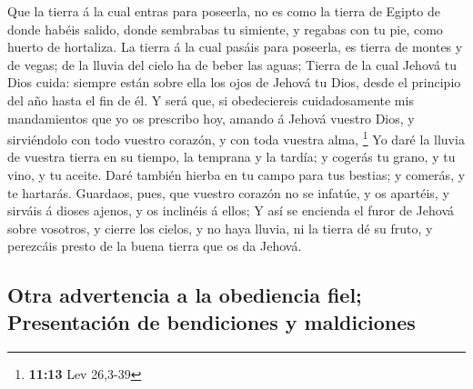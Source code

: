  Que la tierra á la cual entras para poseerla, no es como
la tierra de Egipto de donde habéis salido, donde sembrabas tu simiente,
y regabas con tu pie, como huerto de hortaliza.  La tierra
á la cual pasáis para poseerla, es tierra de montes y de vegas; de la
lluvia del cielo ha de beber las aguas;  Tierra de la cual
Jehová tu Dios cuida: siempre están sobre ella los ojos de Jehová tu
Dios, desde el principio del año hasta el fin de él.  Y
será que, si obedeciereis cuidadosamente mis mandamientos que yo os
prescribo hoy, amando á Jehová vuestro Dios, y sirviéndolo con todo
vuestro corazón, y con toda vuestra alma, \footnote{\textbf{11:13} Lev
  26,3-39}  Yo daré la lluvia de vuestra tierra en su
tiempo, la temprana y la tardía; y cogerás tu grano, y tu vino, y tu
aceite.  Daré también hierba en tu campo para tus bestias;
y comerás, y te hartarás.  Guardaos, pues, que vuestro
corazón no se infatúe, y os apartéis, y sirváis á dioses ajenos, y os
inclinéis á ellos;  Y así se encienda el furor de Jehová
sobre vosotros, y cierre los cielos, y no haya lluvia, ni la tierra dé
su fruto, y perezcáis presto de la buena tierra que os da Jehová.

\hypertarget{otra-advertencia-a-la-obediencia-fiel-presentaciuxf3n-de-bendiciones-y-maldiciones}{%
\subsection{Otra advertencia a la obediencia fiel; Presentación de
bendiciones y
maldiciones}\label{otra-advertencia-a-la-obediencia-fiel-presentaciuxf3n-de-bendiciones-y-maldiciones}}

